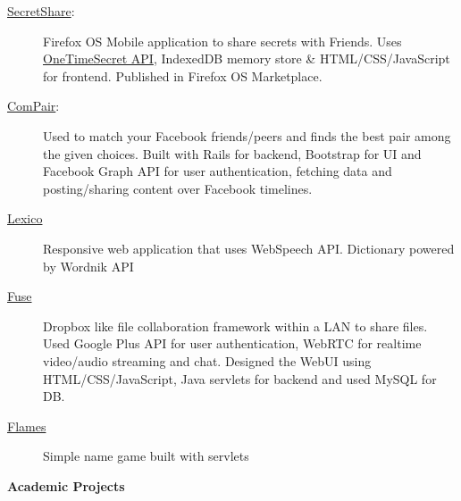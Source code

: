 \documentclass[letterpaper,11pt]{article}
\newcommand{\resheading}[1]{{\large \colorbox{mygrey}{\begin{minipage}{\textwidth}{\textbf{#1 \vphantom{p\^{E}}}}\end{minipage}}}}
\begin{document}
\begin{description}
\item[\href{https://github.com/dtsdwarak/secretshare}{SecretShare}:] { \footnotesize Firefox OS Mobile application to share secrets with Friends. Uses \href{https://onetimesecret.com/}{OneTimeSecret API}, IndexedDB memory store \& HTML/CSS/JavaScript for frontend. Published in Firefox OS Marketplace.}

\item[\href{https://github.com/dtsdwarak/compair}{ComPair}:] { \footnotesize Used to match your Facebook friends/peers and finds the best pair among the given choices. Built with Rails for backend, Bootstrap for UI and Facebook Graph API for user authentication, fetching data and posting/sharing content over Facebook timelines.\color{red}{\bf Won the best creative appliation award at RedHat's OpenShift DevConf 2014, Czech Republic}}

\item[\href{https://dtsdwarak.github.io/lexico/}{Lexico}] { \footnotesize Responsive web application that uses WebSpeech API. Dictionary powered by Wordnik API}

\item[\href{https://github.com/dtsdwarak/fuse}{Fuse}] { \footnotesize Dropbox like file collaboration framework within a LAN to share files. Used Google Plus API for user authentication, WebRTC for realtime video/audio streaming and chat. Designed the WebUI using HTML/CSS/JavaScript, Java servlets for backend and used MySQL for DB.}

\item[\href{https://github.com/dtsdwarak/flames/}{Flames}] { \footnotesize Simple name game built with servlets}

\end{description}

\resheading{{Academic Projects}}
\end{document}

